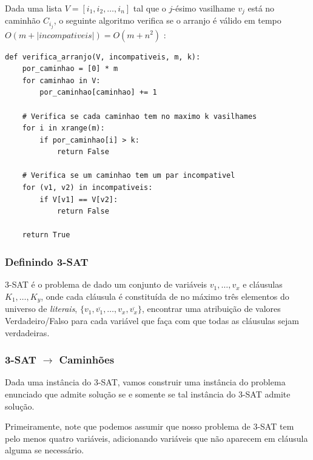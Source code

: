 \documentclass[11pt]{article}
\begin{document}
Dada uma lista $V = [i_1, i_2, \ldots , i_n]$ tal que o
$j$-ésimo vasilhame $v_j$ está no caminhão $C_{i_j}$, o
seguinte algoritmo verifica se o arranjo é válido em tempo
$O(m + |\textit{incompativeis}|) = O(m + n^2)$ :
\begin{verbatim}
def verifica_arranjo(V, incompativeis, m, k):
    por_caminhao = [0] * m
    for caminhao in V:
        por_caminhao[caminhao] += 1

    # Verifica se cada caminhao tem no maximo k vasilhames
    for i in xrange(m):
        if por_caminhao[i] > k:
            return False

    # Verifica se um caminhao tem um par incompativel
    for (v1, v2) in incompativeis:
        if V[v1] == V[v2]:
            return False

    return True
\end{verbatim}

\subsubsection{Definindo 3-SAT}
\label{sec-6-3-2}

3-SAT é o problema de dado um conjunto de variáveis $v_1, \ldots, v_x$
e cláusulas $K_1, \ldots, K_y$, onde cada cláusula é constituída de no
máximo três elementos do universo de \textit{literais}, $\{v_1,
\overline{v_1}, \ldots, v_x, \overline{v_x}\}$, encontrar uma
atribuição de valores Verdadeiro/Falso para cada variável
que faça com que todas as cláusulas sejam verdadeiras.

\subsubsection{3-SAT $\to$ Caminhões}
\label{sec-6-3-3}

Dada uma instância do 3-SAT, vamos construir uma instância do problema
enunciado que admite solução se e somente se tal
instância do 3-SAT admite solução.

Primeiramente, note que podemos assumir que nosso
problema de 3-SAT tem pelo menos quatro variáveis, adicionando
variáveis que não aparecem em cláusula alguma se necessário.
\end{document}
